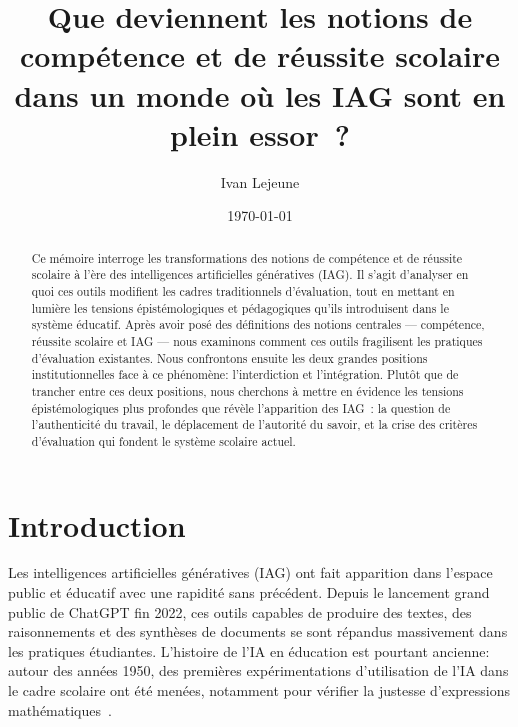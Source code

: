 





\title{\color{astral} \sffamily \bfseries Que deviennent les notions de comp\'etence et de r\'eussite scolaire dans un monde o\`u les IAG sont en plein essor~?}
\author{Ivan Lejeune}
\date{\today}


    \maketitle


\begin{abstract}
Ce m\'emoire interroge les transformations des notions de comp\'etence et de r\'eussite scolaire \`a l'\`ere des intelligences artificielles g\'en\'eratives (IAG). 
Il s'agit d'analyser en quoi ces outils modifient les cadres traditionnels d'\'evaluation, tout en mettant en lumi\`ere les tensions \'epist\'emologiques et p\'edagogiques qu'ils introduisent dans le syst\`eme \'educatif.
Apr\`es avoir pos\'e des d\'efinitions des notions centrales --- comp\'etence, r\'eussite scolaire et IAG --- nous examinons comment ces outils fragilisent les pratiques d'\'evaluation existantes.
Nous confrontons ensuite les deux grandes positions institutionnelles face \`a ce ph\'enom\`ene: l'interdiction et l'int\'egration.
Plut\^ot que de trancher entre ces deux positions, nous cherchons \`a mettre en \'evidence les tensions \'epist\'emologiques plus profondes que r\'ev\`ele l'apparition des IAG~: la question de l'authenticit\'e du travail, le d\'eplacement de l'autorit\'e du savoir, et la crise des crit\`eres d'\'evaluation qui fondent le syst\`eme scolaire actuel.
\end{abstract}


\newpage
\tableofcontents



\newpage
\section{Introduction}


Les intelligences artificielles g\'en\'eratives (IAG) ont fait apparition dans l'espace public et \'educatif avec une rapidit\'e sans pr\'ec\'edent. 
Depuis le lancement grand public de ChatGPT fin 2022, ces outils capables de produire des textes, des raisonnements et des synth\`eses de documents se sont r\'epandus massivement dans les pratiques \'etudiantes. 
L'histoire de l'IA en \'education est pourtant ancienne: autour des années 1950, des premières expérimentations d'utilisation de l'IA dans le cadre scolaire ont \'et\'e men\'ees, notamment pour vérifier la justesse d'expressions math\'ematiques~\cite{jabraoui2024}.

